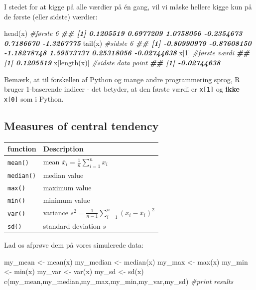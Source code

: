 \documentclass[
]{book}
\newenvironment{Shaded}{\begin{snugshade}}{\end{snugshade}}
\newcommand{\CommentTok}[1]{\textcolor[rgb]{0.56,0.35,0.01}{\textit{#1}}}
\newcommand{\DecValTok}[1]{\textcolor[rgb]{0.00,0.00,0.81}{#1}}
\newcommand{\DocumentationTok}[1]{\textcolor[rgb]{0.56,0.35,0.01}{\textbf{\textit{#1}}}}
\newcommand{\FunctionTok}[1]{\textcolor[rgb]{0.00,0.00,0.00}{#1}}
\newcommand{\NormalTok}[1]{#1}
\newcommand{\OtherTok}[1]{\textcolor[rgb]{0.56,0.35,0.01}{#1}}
\begin{document}
I stedet for at kigge på alle værdier på én gang, vil vi måske hellere kigge kun på de første (eller sidste) værdier:

\begin{Shaded}
\begin{Highlighting}[]
\FunctionTok{head}\NormalTok{(x) }\CommentTok{\#første 6}
\DocumentationTok{\#\# [1]  0.1205519  0.6977209  1.0758056 {-}0.2354673  0.7186670 {-}1.3267775}
\FunctionTok{tail}\NormalTok{(x) }\CommentTok{\#sidste 6}
\DocumentationTok{\#\# [1] {-}0.80990979 {-}0.87608150 {-}1.18278748  1.59573737  0.25318056 {-}0.02744638}
\NormalTok{x[}\DecValTok{1}\NormalTok{] }\CommentTok{\#første værdi}
\DocumentationTok{\#\# [1] 0.1205519}
\NormalTok{x[}\FunctionTok{length}\NormalTok{(x)] }\CommentTok{\#sidste data point}
\DocumentationTok{\#\# [1] {-}0.02744638}
\end{Highlighting}
\end{Shaded}

Bemærk, at til forskellen af Python og mange andre programmering sprog, R bruger 1-baserende indicer - det betyder, at den første værdi er \texttt{x{[}1{]}} og \textbf{ikke} \texttt{x{[}0{]}} som i Python.

\hypertarget{measures-of-central-tendency}{%
\subsection{Measures of central tendency}\label{measures-of-central-tendency}}

\begin{longtable}[]{@{}ll@{}}
\toprule
function & Description \\
\midrule
\endhead
\texttt{mean()} & mean \(\bar{x}_{i} = \frac{1}{n}\sum_{i=1}^{n} x_{i}\) \\
\texttt{median()} & median value \\
\texttt{max()} & maximum value \\
\texttt{min()} & minimum value \\
\texttt{var()} & variance \(s^2 = \frac{1}{n-1}\sum_{i=1}^{n} (x_{i} - \bar{x}_{i})^2\) \\
\texttt{sd()} & standard deviation \(s\) \\
\bottomrule
\end{longtable}

Lad os afprøve dem på vores simulerede data:

\begin{Shaded}
\begin{Highlighting}[]
\NormalTok{my\_mean }\OtherTok{\textless{}{-}} \FunctionTok{mean}\NormalTok{(x)}
\NormalTok{my\_median }\OtherTok{\textless{}{-}} \FunctionTok{median}\NormalTok{(x)}
\NormalTok{my\_max }\OtherTok{\textless{}{-}} \FunctionTok{max}\NormalTok{(x)}
\NormalTok{my\_min }\OtherTok{\textless{}{-}} \FunctionTok{min}\NormalTok{(x)}
\NormalTok{my\_var }\OtherTok{\textless{}{-}} \FunctionTok{var}\NormalTok{(x)}
\NormalTok{my\_sd }\OtherTok{\textless{}{-}} \FunctionTok{sd}\NormalTok{(x)}
\FunctionTok{c}\NormalTok{(my\_mean,my\_median,my\_max,my\_min,my\_var,my\_sd) }\CommentTok{\#print results}
\end{Highlighting}
\end{Shaded}
\end{document}
